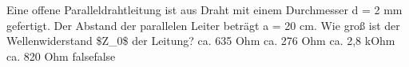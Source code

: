     {Eine offene Paralleldrahtleitung ist aus Draht mit einem Durchmesser d = 2 mm gefertigt. Der Abstand der parallelen Leiter beträgt a = 20 cm. Wie groß ist der Wellenwiderstand \$Z\_0\$ der Leitung?}
    {ca. 635 Ohm}
    {ca. 276 Ohm}
    {ca. 2,8 kOhm}
    {ca. 820 Ohm}
    {false}{false}